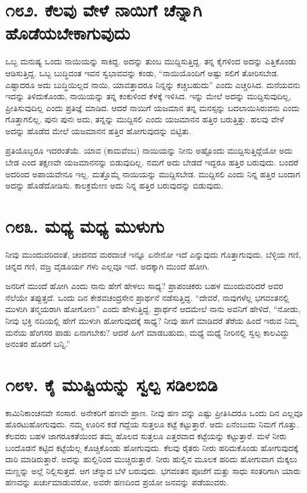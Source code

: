 \section{\num{೧೮೨. } ಕೆಲವು ವೇಳೆ ನಾಯಿಗೆ ಚೆನ್ನಾಗಿ ಹೊಡೆಯಬೇಕಾಗುವುದು}

ಒಬ್ಬ ಮನುಷ್ಯ ಒಂದು ನಾಯಿಯನ್ನು ಸಾಕಿದ್ದ. ಅದನ್ನು ತುಂಬ ಮುದ್ದಿಸುತ್ತಿದ್ದ. ತನ್ನ ಕೈಗಳಿಂದ ಅದನ್ನು ಎತ್ತಿಕೊಂಡು ಆಡಿಸುತ್ತಿದ್ದ. ಒಬ್ಬ ಬುದ್ಧಿವಂತ ಇವನ ಸ್ವಭಾವವನ್ನು ಕಂಡು, “ನಾಯಿಯೊಂದಿಗೆ ಅಷ್ಟು ಸಲಿಗೆ ತೋರಿಸಬೇಡ. ಎಷ್ಟಾದರೂ ಅದು ಬುದ್ಧಿಯಿಲ್ಲದ ನಾಯಿ, ಯಾವತ್ತಾದರೂ ನಿನ್ನನ್ನು ಕಚ್ಚಬಹುದು” ಎಂದು ಎಚ್ಚರಿಸಿದ. ಮನೆಯವನು ಇದನ್ನು ತಿಳಿದುಕೊಂಡು, ನಾಯಿಯನ್ನು ತನ್ನ ಕಂಕುಳಿಂದ ಕೆಳಕ್ಕೆ ಇಳಿಸಿದ. ಇನ್ನು ಮೇಲೆ ಅದನ್ನು ಮುದ್ದಿಸುವುದಿಲ್ಲ, ಪ್ರೀತಿಸುವುದಿಲ್ಲ ಎಂದು ಪ್ರತಿಜ್ಞೆ ಮಾಡಿದ. ಆದರೆ ನಾಯಿಗೆ ಯಜಮಾನ ತನ್ನ ಮನಸ್ಸನ್ನು ಬದಲಾಯಿಸಿರುವನು ಎಂದು ಗೊತ್ತಾಗಲಿಲ್ಲ. ಪುನಃ ಪುನಃ ಅದು, ತನ್ನನ್ನು ಮುದ್ದಿಸಲಿ ಎಂದು ಯಜಮಾನನ ಹತ್ತಿರ ಬರುತ್ತಿತ್ತು. ಹಲವು ವೇಳೆ ಅದನ್ನು ಹೊಡೆದ ಮೇಲೆ ಯಜಮಾನನ ಹತ್ತಿರ ಹೋಗುವುದನ್ನು ಬಿಟ್ಟಿತು.

ಪ್ರತಿಯೊಬ್ಬರೂ ಇದರಂತೆಯೆ. ಯಾವ (ಕಾಮವೆಂಬ) ನಾಯಿಯನ್ನು ನೀನು ಅಷ್ಟೊಂದು ಮುದ್ದಿಸುತ್ತಿದ್ದೆಯೋ ಅದು ಬೇಡ ಎಂದ ತಕ್ಷಣವೇ ಯಜಮಾನನನ್ನು ಬಿಡುವುದಿಲ್ಲ. ನಮಗೆ ಅದು ಬೇಡದೆ ಇದ್ದರೂ ಹತ್ತಿರ ಬರುವುದು. ಬಂದರೆ ಅದರಿಂದ ಅಪಾಯವೇನೂ ಇಲ್ಲ. ಮತ್ತೊಮ್ಮೆ ನಾಯಿಯನ್ನು ಮುದ್ದಿಸಬೇಡ. ಮುದ್ದಿಸಲಿ ಎಂದು ನಿನ್ನ ಹತ್ತಿರ ಬಂದಾಗ ಅದನ್ನು ಹೊಡೆದೋಡಿಸು. ಕಾಲಕ್ರಮೇಣ ಅದು ನಿನ್ನ ಹತ್ತಿರ ಬರುವುದನ್ನು ಬಿಡುವುದು.


\section{\num{೧೮೩. } ಮಧ್ಯ ಮಧ್ಯ ಮುಳುಗು}

ನೀವು ಮುಂದುವರಿದಂತೆ, ಚಂದನದ ಮರದಾಚೆ ಇನ್ನೂ ಏನೇನೋ ಇದೆ ಎನ್ನುವುದು ಗೊತ್ತಾಗುವುದು. ಬೆಳ್ಳಿಯ ಗಣಿ, ಚಿನ್ನದ ಗಣಿ, ವಜ್ರ ವೈಡೂರ್ಯ ಗಳು ಎಲ್ಲವೂ ಇದೆ. ಅದಕ್ಕಾಗಿ ಮುಂದೆ ಹೋಗಿ.

ಜನರಿಗೆ ಮುಂದೆ ಹೋಗಿ ಎಂದು ನಾನು ಹೇಗೆ ಹೇಳಲು ಸಾಧ್ಯ? ಪ್ರಾಪಂಚಿಕರು ಬಹಳ ಮುಂದುವರಿದರೆ ಅವರ ನೆಲೆಯೇ ತಪ್ಪುತ್ತದೆ. ಒಂದು ದಿನ ಕೇಶವಚಂದ್ರಸೇನ ಪ್ರಾರ್ಥನೆ ನಡೆಸುತ್ತಿದ್ದ. “ದೇವರೆ, ನಾವುಗಳೆಲ್ಲ ಭಗವಂತನಲ್ಲಿ ಮುಳುಗಿ ತನ್ಮಯರಾಗಿ ಹೋಗೋಣ” ಎಂದು ಹೇಳುತ್ತಿದ್ದ. ಪ್ರಾರ್ಥನೆ ಆದಮೇಲೆ ನಾನು ಅವನಿಗೆ ಹೇಳಿದೆ, “ನೋಡು, ನೀವು ಭಕ್ತಿ ನದಿಯಲ್ಲಿ ಹೇಗೆ ಮುಳುಗಿ ಹೋಗುವುದಕ್ಕೆ ಸಾಧ್ಯ? ನೀವು ಹಾಗೆ ಮಾಡಿದರೆ ತೆರೆಯ ಹಿಂದೆ ಇರುವ ನಿಮ್ಮ ಮನೆಯ ಹೆಂಗಸರ ಪಾಡು ಏನಾಗಬೇಕು? ಆದರೆ ಹೀಗೆ ಮಾಡಬಹುದು, ಮಧ್ಯೆ ಮಧ್ಯೆ ನೀರಿನಲ್ಲಿ ಸ್ವಲ್ಪ ಕಾಲವಿದ್ದು ಅನಂತರ ಹೊರಗೆ ಬನ್ನಿ.”


\section{\num{೧೮೪. } ಕೈ ಮುಷ್ಟಿಯನ್ನು ಸ್ವಲ್ಪ ಸಡಿಲಬಿಡಿ}

ಕಾಮಿನಿಕಾಂಚನವೇ ಸಂಸಾರ. ಅನೇಕರಿಗೆ ಹಣವೇ ಪ್ರಾಣ. ನೀವು ಹಣ ವನ್ನು ಎಷ್ಟು ಪ್ರೀತಿಸಿದರೂ ಒಂದು ದಿನ ಎಲ್ಲವೂ ಹೊರಟುಹೋಗುವುದು. ನಮ್ಮ ಊರಿನ ಕಡೆ ಗದ್ದೆಯ ಸುತ್ತಲೂ ಕಟ್ಟೆ ಕಟ್ಟುತ್ತಾರೆ. ಅದು ಏನೆಂಬುದು ನಿಮಗೆ ಗೊತ್ತು. ಕೆಲವರು ಬಹಳ ಜಾಗರೂಕತೆಯಿಂದ ತಮ್ಮ ಹೊಲದ ಸುತ್ತಲೂ ಎತ್ತರವಾದ ಕಟ್ಟೆಯನ್ನು ಕಟ್ಟುತ್ತಾರೆ. ಮಳೆ ನೀರು ಬಂದೊಡನೆ ಕಟ್ಟಿದ ಕಟ್ಟೆಯೆಲ್ಲ ಕೊಚ್ಚಿಕೊಂಡು ಹೋಗುವುದು. ಕೆಲವು ರೈತರು ನೀರು ಹರಿದುಕೊಂಡು ಹೋಗುವುದಕ್ಕೆ ದಾರಿ ಮಾಡಿರುತ್ತಾರೆ. ಅದನ್ನು ಹುಲ್ಲಿನಿಂದ ಮುಚ್ಚಿರುತ್ತಾರೆ. ನೀರು ಹುಲ್ಲಿನ ಮೂಲಕ ಹರಿದು ಹೋಗುವಾಗ ಮೆಕ್ಕಲು ಮಣ್ಣನ್ನು ಅಲ್ಲೆ ನಿಲ್ಲಿಸುತ್ತದೆ. ಆಗ ಚೆನ್ನಾದ ಬೆಳೆ ಬರುವುದು. ಭಗವಂತನ ಪೂಜೆಗೆ ಮತ್ತು ಸಾಧು ಸಂತರಿಗಾಗಿ ಯಾರು ಹಣವನ್ನು ಖರ್ಚುಮಾಡುವರೋ, ಅವರೇ ಹಣದಿಂದ ಪ್ರಯೋ ಜನವನ್ನು ಪಡೆಯುವರು.


